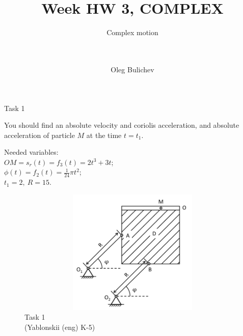 \documentclass[aspectratio=169]{beamer}
\title[Theoretical Mechanics]{Week HW 3, COMPLEX} %
\subtitle{ Complex motion \\
\ \\ \
         } %
\author{Oleg Bulichev}
\newcommand{\fbckg}[1]{\usebackgroundtemplate{\texttt{[image: \#1]}}}%
\begin{document}
\setlength{\abovedisplayskip}{0pt}
\setlength{\belowdisplayskip}{0pt}
\setlength{\abovedisplayshortskip}{0pt}
\setlength{\belowdisplayshortskip}{0pt}

\fbckg{fibeamer/figs/title_page.png}

\fbckg{fibeamer/figs/common.png}

\begin{frame}[t]{Task 1}
    \begin{minipage}{0.6\textwidth}
      You should find an absolute velocity and coriolis acceleration, and absolute acceleration of particle $M$ at the time $t=t_1$. 
      
      Needed variables:\\
      $OM=s_r(t)=f_3(t)=2t^3+3t$;\\
      $\phi(t)=f_2(t)=\frac{1}{24}\pi t^2$;\\
      $t_1=2,\ R=15$.
    \end{minipage}
    \begin{minipage}{0.39\textwidth}
      \vspace*{-0.5cm}
      \begin{figure}[H]
        \centering\includegraphics[height=6cm,width=1\textwidth,keepaspectratio]{HW3_1}
        \caption*{Task 1 \\ (Yablonskii (eng) K-5)}
      \end{figure}
    \end{minipage}
  \end{frame}
  
\end{document}
